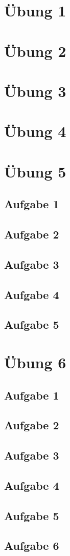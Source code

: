 \documentclass[a4paper,12pt,twoside]{article}
\theoremstyle{definition}
\begin{document}
\section{Übung 1}
\section{Übung 2}
\section{Übung 3}
\section{Übung 4}
\newpage

\section{Übung 5}
\subsection{Aufgabe 1}
\subsection{Aufgabe 2}
\subsection{Aufgabe 3}
\subsection{Aufgabe 4}
\subsection{Aufgabe 5}

\newpage
\section{Übung 6}
\subsection{Aufgabe 1}
\subsection{Aufgabe 2}

\subsection{Aufgabe 3}

\subsection{Aufgabe 4}

\subsection{Aufgabe 5}

\subsection{Aufgabe 6}

\end{document}
